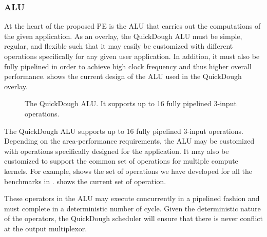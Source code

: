 \subsubsection{ALU}
At the heart of the proposed PE is the ALU that carries out the computations of the given application.  As an overlay, the QuickDough ALU must be simple, regular, and flexible such that it may easily be customized with different operations specifically for any given user application.  In addition, it must also be fully pipelined in order to achieve high clock frequency and thus higher overall performance.   shows the current design of the ALU used in the QuickDough overlay.

\begin{figure}
\caption{The QuickDough ALU. It supports up to 16 fully pipelined 3-input operations.}
\label{fig:ALU}
\end{figure} 

The QuickDough ALU supports up to 16 fully pipelined 3-input operations.  Depending on the area-performance requirements, the ALU may be customized with operations specifically designed for the application.  It may also be customized to support the common set of operations for multiple compute kernels. For example,  shows the set of operations we have developed for all the benchmarks in .   shows the current set of operation.

These operators in the ALU may execute concurrently in a pipelined fashion and must complete in a deterministic number of cycle.  Given the deterministic nature of the operators, the QuickDough scheduler will ensure that there is never conflict at the output multiplexor.



